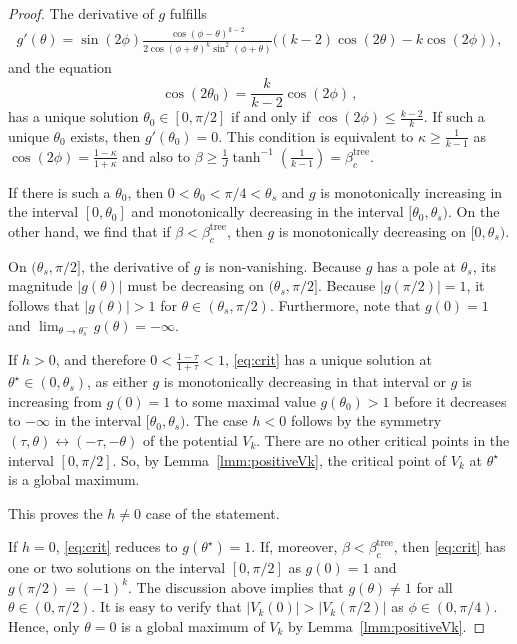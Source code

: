 \documentclass[10pt,a4paper]{amsart}
\begin{document}
\begin{proof}
  The derivative of $g$ fulfills
  \begin{align*}
    g'(\theta) = \sin(2\phi)\frac{\cos(\phi-\theta)^{k-2}}{2\cos(\phi+\theta)^{k}\sin^2(\phi+\theta)} \bigl( (k-2) \cos(2\theta) - k \cos(2\phi) \bigr)\,,
  \end{align*}
  and the equation
  \begin{equation}
    \label{eq:theta_0}
    \cos(2\theta_0) = \frac{k}{k-2}\cos(2\phi)\, ,
  \end{equation}
  has a unique solution $\theta_0 \in [0,\pi/2]$ if and only if 
  $\cos(2\phi) \leq \frac{k-2}{k}$. If such a unique $\theta_0$ exists, then $g'(\theta_0)=0$. This condition is equivalent to $\kappa \geq \frac{1}{k-1}$ as $\cos(2\phi) = \frac{1-\kappa}{1+\kappa}$ 
  and also to $\beta \geq \frac{1}{J} \tanh^{-1}\left( \frac{1}{k-1} \right) = \beta_c^\mathrm{tree}$.

  If there is such a $\theta_0$, then $0<\theta_0 < \pi/4 < \theta_s$
  and $g$ is monotonically increasing in the interval $[0,\theta_0]$ and
  monotonically decreasing in the interval $[\theta_0,\theta_s)$. 
  On the other hand, we find that  if $\beta < \beta_c^\mathrm{tree}$, then
  $g$ is monotonically decreasing on $[0,\theta_s)$.

  On $(\theta_s,\pi/2]$, the derivative of $g$ is non-vanishing. Because $g$ has a pole at $\theta_s$, 
  its magnitude $|g(\theta)|$ must be decreasing on $(\theta_s,\pi/2]$.
  Because $|g(\pi/2)|=1$, it follows that $|g(\theta)| >1$ for $\theta \in (\theta_s,\pi/2)$.
  Furthermore, note that $g(0) =1$ and $\lim_{\theta \rightarrow \theta_s^-} g(\theta) = -\infty$.

  If $h > 0$, and therefore $0<\frac{1-\tau}{1+\tau} < 1$, \eqref{eq:crit} has a unique solution at $\theta^\star \in (0,\theta_s)$,
  as either $g$ is monotonically decreasing in that interval or $g$ is increasing from $g(0)=1$ to some maximal value $g(\theta_0) >1$ before it 
  decreases to $-\infty$ in the interval $[\theta_0,\theta_s)$. The case $h<0$ follows by the symmetry $(\tau,\theta) \leftrightarrow (-\tau,-\theta)$ of the potential $V_k$.
  There are no other critical points in the interval $[0,\pi/2]$. So, by Lemma~\ref{lmm:positiveVk}, the critical point of $V_k$ at $\theta^\star$ is a global maximum.

  This proves the $h \neq 0$ case of the statement.

  If $h=0$, \eqref{eq:crit} reduces to $g(\theta^\star) = 1$. 
  If, moreover, $\beta < \beta_c^\mathrm{tree}$, then \eqref{eq:crit} 
  has one or two solutions on the interval $[0,\pi/2]$ as $g(0) = 1$ and $g(\pi/2) = (-1)^k$.
  The discussion above implies that $g(\theta) \neq 1$ for all $\theta \in (0,\pi/2)$.
  It is easy to verify that $|V_k(0)| > |V_k(\pi/2)|$ as $\phi \in (0,\pi/4)$. Hence, only $\theta = 0$ is a
  global maximum of $V_k$ by Lemma~\ref{lmm:positiveVk}.


\end{proof}
\end{document}
